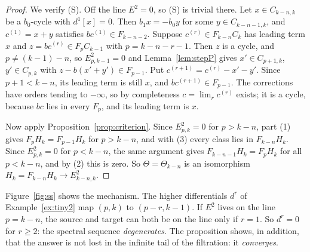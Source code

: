 \documentclass[11pt,oneside,reqno]{article}
\theoremstyle{plain}
\theoremstyle{definition}
\theoremstyle{remark}
\begin{document}
\begin{proof}
We verify (S). Off the line \(E^2=0\), so (S) is trivial there. Let
\(x\in C_{k-n,k}\) be a \(b_0\)-cycle with \(d^1[x]=0\). Then \(b_1x=-b_0y\) for some
\(y\in C_{k-n-1,k}\), and \(c^{(1)}=x+y\) satisfies \(bc^{(1)}\in F_{k-n-2}\).
Suppose \(c^{(r)}\in F_{k-n}C_k\) has leading term \(x\) and
\(z=bc^{(r)}\in F_{p}C_{k-1}\) with \(p=k-n-r-1\). Then \(z\) is a cycle, and
\(p\neq(k-1)-n\), so \(E^2_{p,k-1}=0\) and Lemma~\ref{lem:stepP} gives
\(x'\in C_{p+1,k}\), \(y'\in C_{p,k}\) with \(z-b(x'+y')\in F_{p-1}\). Put
\(c^{(r+1)}=c^{(r)}-x'-y'\). Since \(p+1<k-n\), its leading term is still \(x\), and
\(bc^{(r+1)}\in F_{p-1}\). The corrections have orders tending to \(-\infty\), so
by completeness \(c=\lim_rc^{(r)}\) exists; it is a cycle, because \(bc\) lies in
every \(F_p\), and its leading term is \(x\).

Now apply Proposition~\ref{prop:criterion}. Since \(E^2_{p,k}=0\) for
\(p>k-n\), part (1) gives \(F_pH_k=F_{p-1}H_k\) for \(p>k-n\), and with (3) every
class lies in \(F_{k-n}H_k\). Since \(E^2_{p,k}=0\) for \(p<k-n\), the same argument
gives \(F_{k-n-1}H_k=F_pH_k\) for all \(p<k-n\), and by (2) this is zero. So
\(\Theta=\Theta_{k-n}\) is an isomorphism \(H_k=F_{k-n}H_k\to E^2_{k-n,k}\).
\end{proof}

Figure~\ref{fig:ss} shows the mechanism. The higher differentials \(d^r\)
of Example~\ref{ex:tiny2} map \((p,k)\) to \((p-r,k-1)\). If \(E^2\) lives on the
line \(p=k-n\), the source and target can both be on the line only if
\(r=1\). So \(d^r=0\) for \(r\ge2\): the spectral sequence \emph{degenerates}. The
proposition shows, in addition, that the answer is not lost in the
infinite tail of the filtration: it \emph{converges}.
\end{document}
